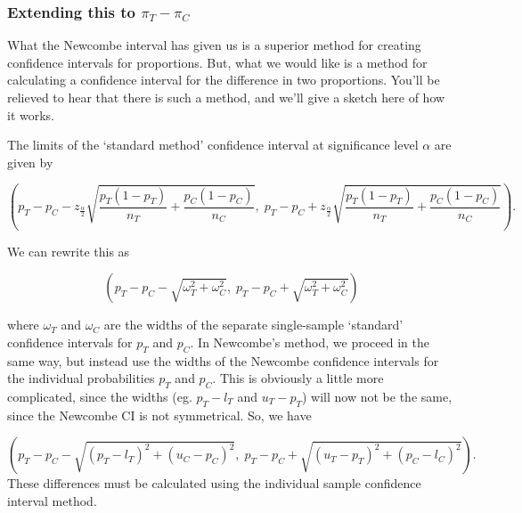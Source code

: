 \documentclass[
  openany]{book}
\theoremstyle{definition}
\theoremstyle{definition}
\theoremstyle{definition}
\theoremstyle{definition}
\theoremstyle{remark}
\begin{document}
\hypertarget{newcombeci}{%
\subsubsection{\texorpdfstring{Extending this to \(\pi_T - \pi_C\)}{Extending this to \textbackslash pi\_T - \textbackslash pi\_C}}\label{newcombeci}}

What the Newcombe interval has given us is a superior method for creating confidence intervals for proportions. But, what we would like is a method for calculating a confidence interval for the difference in two proportions. You'll be relieved to hear that there is such a method, and we'll give a sketch here of how it works.

The limits of the `standard method' confidence interval at significance level \(\alpha\) are given by

\begin{equation}
\left(p_T - p_C - z_{\frac{\alpha}{2}}\sqrt{\frac{p_T\left(1-p_T\right)}{n_T} + \frac{p_C\left(1-p_C\right)}{n_C}},\; p_T - p_C + z_{\frac{\alpha}{2}}\sqrt{\frac{p_T\left(1-p_T\right)}{n_T} + \frac{p_C\left(1-p_C\right)}{n_C}}\right).
\label{eq:ardci}
\end{equation}

We can rewrite this as

\begin{equation}
\left(p_T - p_C - \sqrt{\omega^2_T + \omega^2_C},\; p_T - p_C + \sqrt{\omega^2_T + \omega^2_C}\right)
\end{equation}

where \(\omega_T\) and \(\omega_C\) are the widths of the separate single-sample `standard' confidence intervals for \(p_T\) and \(p_C\). In Newcombe's method, we proceed in the same way, but instead use the widths of the Newcombe confidence intervals for the individual probabilities \(p_T\) and \(p_C\). This is obviously a little more complicated, since the widths (eg. \(p_T - l_T\) and \(u_T - p_T\)) will now not be the same, since the Newcombe CI is not symmetrical. So, we have

\[
\left(p_T - p_C - \sqrt{\left(p_T-l_T\right)^2 + \left(u_C - p_C\right)^2},\; p_T - p_C + \sqrt{\left(u_T - p_T\right)^2 + \left(p_C - l_C\right)^2}\right).
\]
These differences must be calculated using the individual sample confidence interval method.
\end{document}
